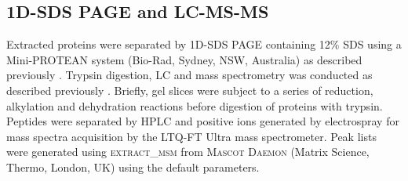 \subsection{\acs{1D-SDS PAGE} and \acs{LC}-\acs{MS-MS}}
Extracted proteins were separated by \ac{1D-SDS PAGE} containing 12\% SDS using a Mini-PROTEAN system (Bio-Rad, Sydney, NSW, Australia) as described previously \cite{Saunders2006}.
Trypsin digestion, \ac{LC} and mass spectrometry was conducted as described previously \cite{Ng2010a, Ng2010b, Lauro2011}.
Briefly, gel slices were subject to a series of reduction, alkylation and dehydration reactions before digestion of proteins with trypsin.
Peptides were separated by \ac{HPLC} and positive ions generated by electrospray for mass spectra acquisition by the LTQ-FT Ultra mass spectrometer.
Peak lists were generated using \textsc{extract\_msm} from \textsc{Mascot Daemon} (Matrix Science, Thermo, London, \textsc{UK}) using the default parameters.


